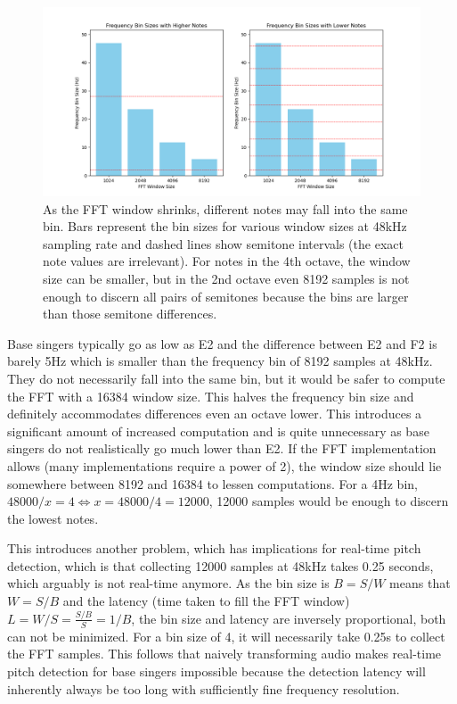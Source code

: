 \begin{figure}[ht]
    \centering
    \includegraphics[width=\textwidth]{./images/fft_bin_size_chart.png}
    \caption{As the FFT window shrinks, different notes may fall into the same bin. Bars represent the bin sizes for various window sizes at 48kHz sampling rate and dashed lines show semitone intervals (the exact note values are irrelevant). For notes in the 4th octave, the window size can be smaller, but in the 2nd octave even 8192 samples is not enough to discern all pairs of semitones because the bins are larger than those semitone differences.\label{fig:fftBinSizeChart}}
\end{figure}

Base singers typically go as low as E2 and the difference between E2 and F2 is barely 5Hz which is smaller than the frequency bin of 8192 samples at 48kHz. They do not necessarily fall into the same bin, but it would be safer to compute the FFT with a 16384 window size. This halves the frequency bin size and definitely accommodates differences even an octave lower. This introduces a significant amount of increased computation and is quite unnecessary as base singers do not realistically go much lower than E2. If the FFT implementation allows (many implementations require a power of 2), the window size should lie somewhere between 8192 and 16384 to lessen computations. For a 4Hz bin, $48000/x = 4 \iff x = 48000/4 = 12000$, 12000 samples would be enough to discern the lowest notes. 

This introduces another problem, which has implications for real-time pitch detection, which is that collecting 12000 samples at 48kHz takes 0.25 seconds, which arguably is not real-time anymore. As the bin size is $B = S/W$ means that $W = S/B$ and the latency (time taken to fill the FFT window) $L = W/S = \frac{S/B}{S} = 1/B$, the bin size and latency are inversely proportional, both can not be minimized. For a bin size of 4, it will necessarily take 0.25s to collect the FFT samples. This follows that naively transforming audio makes real-time pitch detection for base singers impossible because the detection latency will inherently always be too long with sufficiently fine frequency resolution.

